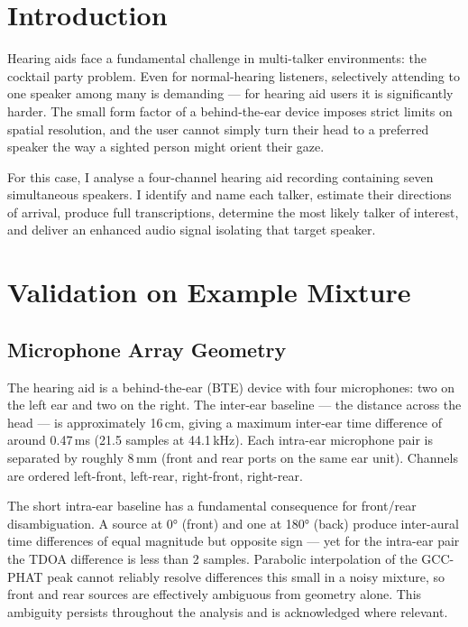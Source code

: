 \section{Introduction}

Hearing aids face a fundamental challenge in multi-talker environments: the cocktail party problem. Even for normal-hearing listeners, selectively attending to one speaker among many is demanding — for hearing aid users it is significantly harder. The small form factor of a behind-the-ear device imposes strict limits on spatial resolution, and the user cannot simply turn their head to a preferred speaker the way a sighted person might orient their gaze.

For this case, I analyse a four-channel hearing aid recording containing seven simultaneous speakers. I identify and name each talker, estimate their directions of arrival, produce full transcriptions, determine the most likely talker of interest, and deliver an enhanced audio signal isolating that target speaker.

\section{Validation on Example Mixture}

\subsection{Microphone Array Geometry}

The hearing aid is a behind-the-ear (BTE) device with four microphones: two on the left ear and two on the right. The inter-ear baseline — the distance across the head — is approximately 16\,cm, giving a maximum inter-ear time difference of around 0.47\,ms (21.5 samples at 44.1\,kHz). Each intra-ear microphone pair is separated by roughly 8\,mm (front and rear ports on the same ear unit). Channels are ordered left-front, left-rear, right-front, right-rear.

The short intra-ear baseline has a fundamental consequence for front/rear disambiguation. A source at 0° (front) and one at 180° (back) produce inter-aural time differences of equal magnitude but opposite sign — yet for the intra-ear pair the TDOA difference is less than 2 samples. Parabolic interpolation of the GCC-PHAT peak cannot reliably resolve differences this small in a noisy mixture, so front and rear sources are effectively ambiguous from geometry alone. This ambiguity persists throughout the analysis and is acknowledged where relevant.

